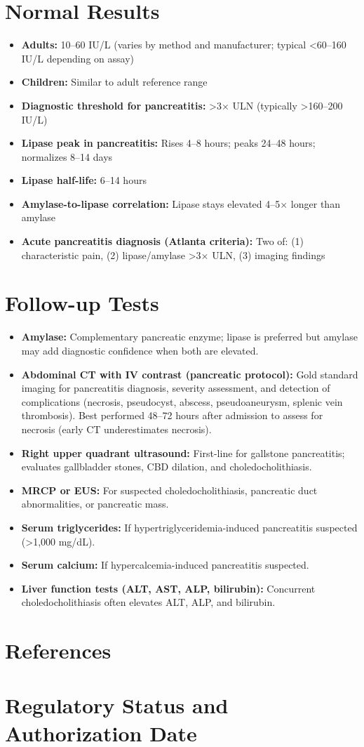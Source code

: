\section*{Normal Results}
\begin{itemize}
  \item \textbf{Adults:} 10--60 IU/L (varies by method and manufacturer; typical <60--160 IU/L depending on assay) \cite{wallach2022interpretation}
  \item \textbf{Children:} Similar to adult reference range
  \item \textbf{Diagnostic threshold for pancreatitis:} >3$\times$ ULN (typically >160--200 IU/L)
  \item \textbf{Lipase peak in pancreatitis:} Rises 4--8 hours; peaks 24--48 hours; normalizes 8--14 days
  \item \textbf{Lipase half-life:} 6--14 hours
  \item \textbf{Amylase-to-lipase correlation:} Lipase stays elevated 4--5$\times$ longer than amylase
  \item \textbf{Acute pancreatitis diagnosis (Atlanta criteria):} Two of: (1) characteristic pain, (2) lipase/amylase >3$\times$ ULN, (3) imaging findings
\end{itemize}

\section*{Follow-up Tests}
\begin{itemize}
  \item \textbf{Amylase:} Complementary pancreatic enzyme; lipase is preferred but amylase may add diagnostic confidence when both are elevated.
  \item \textbf{Abdominal CT with IV contrast (pancreatic protocol):} Gold standard imaging for pancreatitis diagnosis, severity assessment, and detection of complications (necrosis, pseudocyst, abscess, pseudoaneurysm, splenic vein thrombosis). Best performed 48--72 hours after admission to assess for necrosis (early CT underestimates necrosis).
  \item \textbf{Right upper quadrant ultrasound:} First-line for gallstone pancreatitis; evaluates gallbladder stones, CBD dilation, and choledocholithiasis.
  \item \textbf{MRCP or EUS:} For suspected choledocholithiasis, pancreatic duct abnormalities, or pancreatic mass.
  \item \textbf{Serum triglycerides:} If hypertriglyceridemia-induced pancreatitis suspected (>1,000 mg/dL).
  \item \textbf{Serum calcium:} If hypercalcemia-induced pancreatitis suspected.
  \item \textbf{Liver function tests (ALT, AST, ALP, bilirubin):} Concurrent choledocholithiasis often elevates ALT, ALP, and bilirubin.
\end{itemize}

\section*{References}



\clearpage
\section*{Regulatory Status and Authorization Date}

\clearpage
